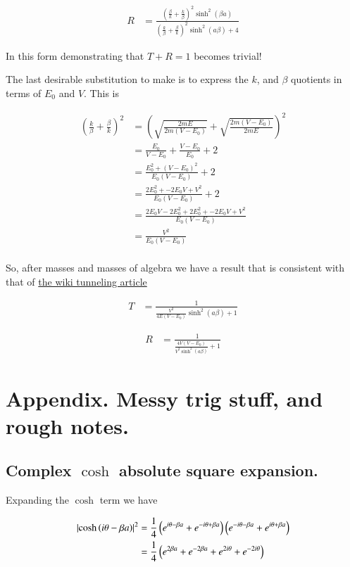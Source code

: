 \documentclass{article}
\begin{document}
\begin{align}
R 
&= \frac{ 
\left(\frac{\beta}{k} + \frac{k}{\beta} \right)^2 
\sinh^2( \beta a)} { 
\left( \frac{k}{\beta} +\frac{\beta}{k} \right)^2 
\sinh^2(a \beta) + 4 
}
\end{align}

In this form demonstrating that $T + R=1$ becomes trivial!

The last desirable substitution to make is to express the $k$, and $\beta$ quotients in terms of $E_0$ and $V$.  This is

\begin{align*}
\left(\frac{k}{\beta} + \frac{\beta}{k}\right)^2
&=
\left(\sqrt{\frac{2mE}{2m(V-E_0)}} + \sqrt{\frac{2m(V-E_0)}{2mE}}\right)^2 \\
&=
\frac{E_0}{V-E_0} + \frac{V-E_0}{E_0} + 2 \\
&=
\frac{E_0^2 + (V-E_0)^2}{E_0(V-E_0)} + 2 \\
&=
\frac{2 E_0^2 + -2 E_0 V + V^2 }{E_0(V-E_0)} + 2 \\
&=
\frac{2 E_0 V -2 E_0^2 + 2 E_0^2 + -2 E_0 V + V^2 }{E_0(V-E_0)} \\
&=
\frac{V^2 }{E_0(V-E_0)} \\
\end{align*}

So, after masses and masses of algebra we have a result that is consistent with that of
\href{http://en.wikipedia.org/wiki/Potential_barrier}{the wiki tunneling article}

\begin{align}
T 
&= \frac{1} { \frac{V^2}{4E(V-E_0)} \sinh^2(a \beta) + 1 }
\end{align}

\begin{align}
R 
&= \frac{1} { \frac{4V(V-E_0)}{V^2 \sinh^2(a \beta)} + 1 }
\end{align}

\section{ Appendix.  Messy trig stuff, and rough notes. }

\subsection{ Complex $\cosh$ absolute square expansion. }

Expanding the $\cosh$ term we have

\begin{align*}
\left\lvert{\cosh\left( i\theta -\beta a \right)}\right\rvert^2
&=
\frac{1}{4}
\left(
e^{i\theta - \beta a}
+ e^{-i\theta + \beta a}
\right)
\left(
e^{-i\theta - \beta a}
+ e^{i\theta + \beta a}
\right) \\
&=
\frac{1}{4}\left(
e^{2\beta a}
+ e^{-2\beta a}
+e^{2i\theta }
+e^{-2i\theta }
\right) \\
\end{align*}
\end{document}
